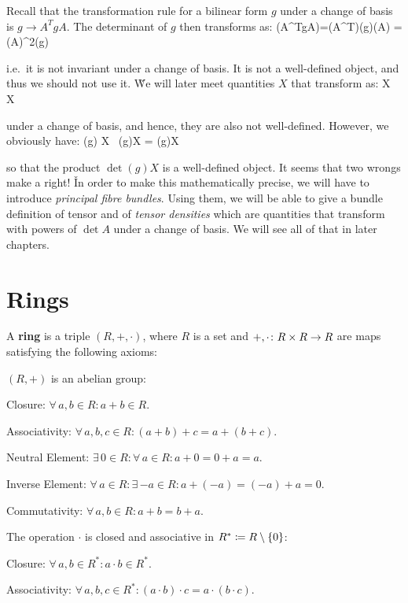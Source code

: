 Recall that the transformation rule for a bilinear form $g$ under a change of basis is $g \to A^T gA$. The determinant
of $g$ then transforms as:
\bse
\det(A^TgA)=\det(A^T)\det(g)\det(A) = (\det A)^2\det(g)
\ese

i.e.\ it is not invariant under a change of basis. It is not a well-defined object, and thus we should not use it. \v

We will later meet quantities $X$ that transform as:
\bse
X \to {} \, X
\ese

under a change of basis, and hence, they are also not well-defined. However, we obviously have:
\bse
\det(g) X \to {} \, \det(g)X = \det(g)X
\ese

so that the product $\det(g)X$ is a well-defined object. It seems that two wrongs make a right! \v

In order to make this mathematically precise, we will have to introduce \emph{principal fibre bundles}. Using them,
we will be able to give a bundle definition of tensor and of \emph{tensor densities} which are quantities that
transform with powers of $\det A$ under a change of basis. We will see all of that in later chapters.

\section{Rings}

\bd [Ring]
A \textbf{ring} is a triple $(R,+,\cdot)$, where $R$ is a set and $+,\cdot\colon R\times R\to R$ are maps satisfying the
following axioms:
\bit
\item $(R,+)$ is an abelian group:
\ben
\item[i)] Closure: $\forall \, a,b \in R : a + b \in R$.
\item[ii)] Associativity: $\forall \, a,b,c \in R : (a+b)+c=a+(b+c)$.
\item[iii)] Neutral Element: $\exists \, 0 \in R : \forall \, a \in R : a+0=0+a=a$.
\item[iv)] Inverse Element: $\forall \, a \in R : \exists \, {-a} \in R : a+(-a)=(-a)+a=0$.
\item[v)] Commutativity: $\forall \, a,b \in R : a+b=b+a$.
\een

\item The operation $\cdot$ is closed and associative in $R^* \coloneqq R\setminus\{0\}$:
\ben
\item[vi)] Closure: $\forall \, a,b \in R^* : a \cdot b \in R^*$.
\item[vii)] Associativity: $\forall \, a,b,c \in R^* : (a\cdot b)\cdot c=a\cdot (b\cdot c)$.
\een

